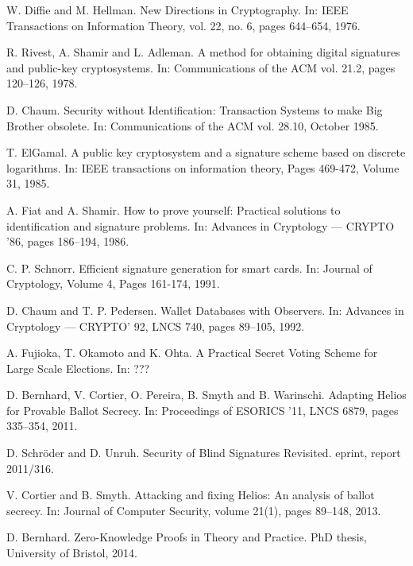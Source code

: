 \documentclass{llncs}
\begin{document}
\begin{thebibliography}{XXX11}

W. Diffie and M. Hellman.
New Directions in Cryptography.
In: IEEE Transactions on Information Theory, vol. 22, no. 6, pages 644--654, 1976.

R. Rivest, A. Shamir and L. Adleman.
A method for obtaining digital signatures and public-key cryptosystems.
In: Communications of the ACM vol. 21.2, pages 120--126, 1978.

D. Chaum.
Security without Identification: Transaction Systems to make Big Brother obsolete.
In: Communications of the ACM vol. 28.10, October 1985.

T. ElGamal.
A public key cryptosystem and a signature scheme based on discrete logarithms.
In: IEEE transactions on information theory, Pages 469-472, Volume 31, 1985.

A. Fiat and A. Shamir.
How to prove yourself: Practical solutions to identification and signature problems.
In: Advances in Cryptology --- CRYPTO '86, pages 186--194, 1986.

C. P. Schnorr.
Efficient signature generation for smart cards.
In: Journal of Cryptology, Volume 4, Pages 161-174, 1991.

D. Chaum and T. P. Pedersen.
Wallet Databases with Observers.
In: Advances in Cryptology --- CRYPTO' 92, LNCS 740, pages 89--105, 1992.

A. Fujioka, T. Okamoto and K. Ohta.
A Practical Secret Voting Scheme for Large Scale Elections.
In: ???

D. Bernhard, V. Cortier, O. Pereira, B. Smyth and B. Warinschi.
Adapting Helios for Provable Ballot Secrecy.
In: Proceedings of ESORICS '11, LNCS 6879, pages 335--354, 2011.

D. Schr\"oder and D. Unruh.
Security of Blind Signatures Revisited.
eprint, report 2011/316.

V. Cortier and B. Smyth.
Attacking and fixing Helios: An analysis of ballot secrecy.
In: Journal of Computer Security, volume 21(1), pages 89--148, 2013.

D. Bernhard.
Zero-Knowledge Proofs in Theory and Practice.
PhD thesis, University of Bristol, 2014.

\end{thebibliography}
\end{document}
